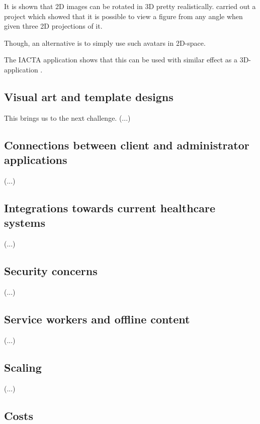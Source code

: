 It is shown that 2D images can be rotated in 3D pretty realistically. \textcite{rivers2010} carried out a project which showed that it is possible to view a figure from any angle when given three 2D projections of it.

Though, an alternative is to simply use such avatars in 2D-space. 

The IACTA application shows that this can be used with similar effect as a 3D-application \autocite{stalberg2018}.

\subsection{Visual art and template designs}

This brings us to the next challenge. (...)

\subsection{Connections between client and administrator applications}

(...)

\subsection{Integrations towards current healthcare systems}

(...)

\subsection{Security concerns}

(...)

\subsection{Service workers and offline content}

(...)


\subsection{Scaling}

(...)

\subsection{Costs}

